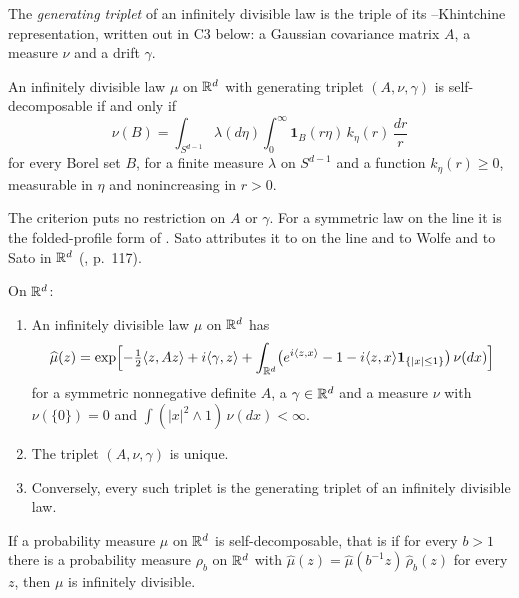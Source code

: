 The \emph{generating triplet} of an infinitely divisible law is the triple of its
\Levy--Khintchine representation, written out in C3 below: a Gaussian covariance matrix $A$, a
\Levy{} measure $\nu$ and a drift $\gamma$.

\begin{theorem}\label{thm:cited-A2}
An infinitely divisible law $\mu$ on $\mathbb{R}^d$ with generating triplet $(A, \nu, \gamma)$ is
self-decomposable if and only if
\[
  \nu(B) = \int_{S^{d-1}}\lambda(d\eta)\int_0^\infty \mathbf{1}_B(r\eta)\,k_\eta(r)\,\frac{dr}{r}
\]
for every Borel set $B$, for a finite measure $\lambda$ on $S^{d-1}$ and a function
$k_\eta(r) \ge 0$, measurable in $\eta$ and nonincreasing in $r > 0$.
\end{theorem}

The criterion puts no restriction on $A$ or $\gamma$. For a symmetric law on the line it is
the folded-profile form of . Sato attributes it to \Levy{} on the line and to
Wolfe and to Sato in $\mathbb{R}^d$ (, p.~117).

\begin{theorem}\label{thm:cited-A3}
On $\mathbb{R}^d$:
\begin{enumerate}
\item[(i)] An infinitely divisible law $\mu$ on $\mathbb{R}^d$ has
\[
  \widehat\mu(z) = \exp\Bigl[-\tfrac12\langle z, Az\rangle + i\langle\gamma, z\rangle
   + \int_{\mathbb{R}^d}\bigl(e^{i\langle z,x\rangle} - 1 - i\langle z,x\rangle\mathbf{1}_{\{|x| \le 1\}}\bigr)\,
     \nu(dx)\Bigr]
\]
for a symmetric nonnegative definite $A$, a $\gamma \in \mathbb{R}^d$ and a measure $\nu$ with
$\nu(\{0\}) = 0$ and $\int(|x|^2 \wedge 1)\,\nu(dx) < \infty$.
\item[(ii)] The triplet $(A, \nu, \gamma)$ is unique.
\item[(iii)] Conversely, every such triplet is the generating triplet of an infinitely divisible
law.
\end{enumerate}
\end{theorem}

\begin{theorem}\label{thm:cited-A4}
If a probability measure $\mu$ on $\mathbb{R}^d$ is self-decomposable, that is if for every $b > 1$ there
is a probability measure $\rho_b$ on $\mathbb{R}^d$ with
$\widehat\mu(z) = \widehat\mu(b^{-1}z)\,\widehat\rho_b(z)$ for every $z$, then $\mu$ is
infinitely divisible.
\end{theorem}

